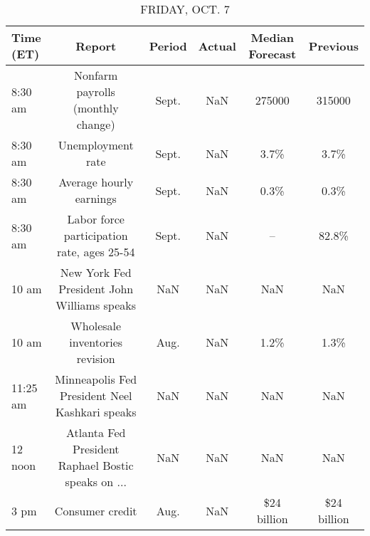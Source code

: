 \documentclass{article}%
\begin{document}
\begin{table}[htbp]%
\caption{FRIDAY, OCT. 7}%
\centering%
\begin{adjustbox}{width=1\textwidth}%
\begin{tabular}{lccccc}
\toprule
Time (ET) &                                             Report & Period & Actual & Median Forecast &    Previous \\
\midrule
  8:30 am &                  Nonfarm payrolls (monthly change) &  Sept. &    NaN &          275000 &      315000 \\
  8:30 am &                                  Unemployment rate &  Sept. &    NaN &            3.7\% &        3.7\% \\
  8:30 am &                            Average hourly earnings &  Sept. &    NaN &            0.3\% &        0.3\% \\
  8:30 am &         Labor force participation rate, ages 25-54 &  Sept. &    NaN &              -- &       82.8\% \\
    10 am &        New York Fed President John Williams speaks &    NaN &    NaN &             NaN &         NaN \\
    10 am &                     Wholesale inventories revision &   Aug. &    NaN &            1.2\% &        1.3\% \\
 11:25 am &     Minneapolis Fed President Neel Kashkari speaks &    NaN &    NaN &             NaN &         NaN \\
  12 noon & Atlanta Fed President Raphael Bostic speaks on ... &    NaN &    NaN &             NaN &         NaN \\
     3 pm &                                    Consumer credit &   Aug. &    NaN &     \$24 billion & \$24 billion \\
\bottomrule
\end{tabular}
%
\end{adjustbox}%
\end{table}
\end{document}
